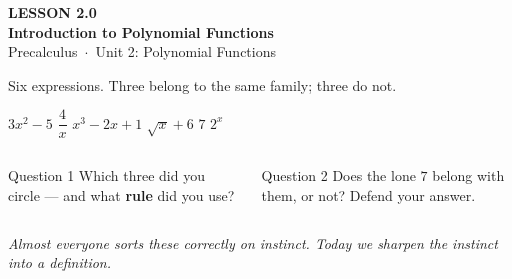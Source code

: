 \documentclass[aspectratio=169, 11pt]{beamer}
\begin{document}
{
\begin{frame}[plain]
  \vspace{2.8cm}\hspace{0.55cm}%
  \begin{minipage}{0.9\textwidth}
    {\color{goldacc}\bfseries\small LESSON 2.0}\\[0.5cm]
    {\color{white}\bfseries\LARGE Introduction to Polynomial Functions}\\[1.2cm]
    {\color{lilacmid}\small Precalculus~$\cdot$~Unit 2: Polynomial Functions}
  \end{minipage}
\end{frame}
}

\begin{frame}[t, plain]

  Six expressions. Three belong to the same family; three do not.

  \bigskip
  \begin{center}
    \Large
    $3x^2 - 5$ \qquad $\dfrac{4}{x}$ \qquad $x^3 - 2x + 1$ \qquad
    $\sqrt{x} + 6$ \qquad $7$ \qquad $2^x$
  \end{center}

  \bigskip
  \begin{columns}[T]
      \begin{block}{Question 1}
        Which three did you circle --- and what \textbf{rule} did you use?
      \end{block}

      \begin{block}{Question 2}
        Does the lone $7$ belong with them, or not? Defend your answer.
      \end{block}
  \end{columns}

  \bigskip
  \textit{Almost everyone sorts these correctly on instinct. Today we sharpen the
  instinct into a definition.}
\end{frame}
\end{document}
